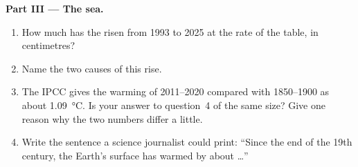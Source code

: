 \begin{problem}
\noindent\textbf{Part III --- The sea.}\par\nopagebreak
\begin{enumerate}[resume, beginpenalty=10000]
  \item How much has the  risen from 1993 to 2025 at the rate of the
        table, in centimetres?
  \item Name the two causes of this rise.
  \item The IPCC gives the warming of 2011--2020 compared with 1850--1900
        as about \qty{1.09}{\degreeCelsius}. Is your answer to question~4
        of the same size? Give one reason why the two numbers differ a
        little.
  \item Write the sentence a science journalist could print: ``Since the
        end of the 19th century, the Earth's surface has warmed by
        about \ldots''
\end{enumerate}
\end{problem}
